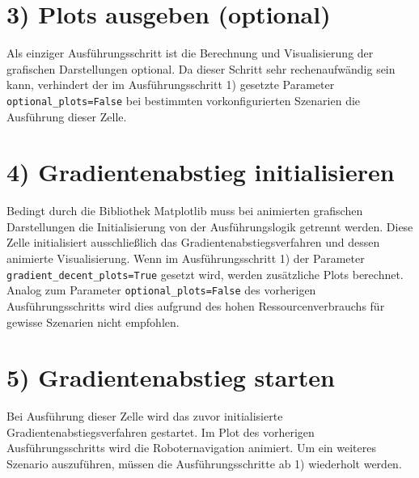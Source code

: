 \section*{3) Plots ausgeben (optional)}
Als einziger Ausführungsschritt ist die Berechnung und Visualisierung der grafischen Darstellungen optional. Da dieser Schritt sehr rechenaufwändig sein kann, verhindert der im Ausführungsschritt 1) gesetzte Parameter \texttt{optional\_plots=False} bei bestimmten vorkonfigurierten Szenarien die Ausführung dieser Zelle.

\section*{4) Gradientenabstieg initialisieren}
Bedingt durch die Bibliothek Matplotlib muss bei animierten grafischen Darstellungen die Initialisierung von der Ausführungslogik getrennt werden.
Diese Zelle initialisiert ausschließlich das Gradientenabstiegsverfahren und dessen animierte Visualisierung. Wenn im Ausführungsschritt 1) der Parameter \texttt{gradient\_decent\_plots=True} gesetzt wird, werden zusätzliche Plots berechnet. Analog zum Parameter \texttt{optional\_plots=False} des vorherigen Ausführungsschritts wird dies aufgrund des hohen Ressourcenverbrauchs für gewisse Szenarien nicht empfohlen.

\section*{5) Gradientenabstieg starten}
Bei Ausführung dieser Zelle wird das zuvor initialisierte Gradientenabstiegsverfahren gestartet. Im Plot des vorherigen Ausführungsschritts wird die Roboternavigation animiert.
Um ein weiteres Szenario auszuführen, müssen die Ausführungsschritte ab 1) wiederholt werden.


